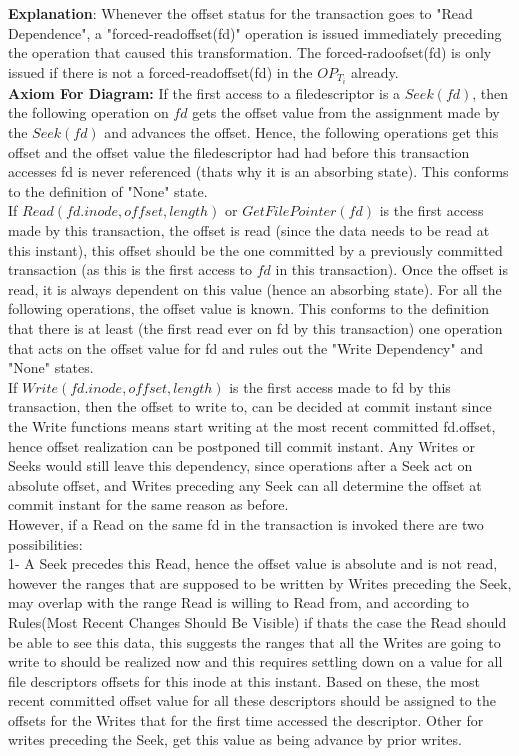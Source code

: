 \documentclass[a4paper, 11pt]{article}
\begin{document}
\textbf{Explanation}: Whenever the offset status for the transaction goes to "Read Dependence", a "forced-readoffset(fd)" operation is issued immediately preceding the operation that caused this transformation. The forced-radoofset(fd) is only issued if there is not a forced-readoffset(fd) in the $OP_{T_i}$ already.\\ 

\textbf{Axiom For Diagram:} If the first access to a filedescriptor is a $Seek(fd)$, then the following operation on $fd$ gets the offset value from the assignment made by the $Seek(fd)$ and advances the offset. Hence, the following operations get this offset and the offset value the filedescriptor had had before this transaction accesses fd is never referenced (thats why it is an absorbing state). This conforms to the definition of "None" state.\\ 

If $Read(fd.inode, offset, length)$ or $GetFilePointer(fd)$ is the first access made by this transaction, the offset is read (since the data needs to be read at this instant), this offset should be the one committed by a previously committed transaction (as this is the first access to $fd$ in this transaction). Once the offset is read, it is always dependent on this value (hence an absorbing state). For all the following operations, the offset value is known. This conforms to the definition that there is at least (the first read ever on fd by this transaction) one operation that acts on the offset value for fd and rules out the "Write Dependency" and "None" states.\\

If $Write(fd.inode, offset, length)$ is the first access made to fd by this transaction, then the offset to write to, can be decided at commit instant since the Write functions means start writing at the most recent committed fd.offset, hence offset realization can be postponed till commit instant. Any Writes or Seeks would still leave this dependency, since operations after a Seek act on absolute offset, and Writes preceding any Seek can all determine the offset at commit instant for the same reason as before.\\    

However, if a Read on the same fd in the transaction is invoked there are two possibilities:\\

1- A Seek precedes this Read, hence the offset value is absolute and is not read, however the ranges that are supposed to be written by Writes preceding the Seek, may overlap with the range Read is willing to Read from, and according to Rules(Most Recent Changes Should Be Visible) if thats the case the Read should be able to see this data, this suggests the ranges that all the Writes are going to write to should be realized now and this requires settling down on a value for all file descriptors offsets for this inode at this instant. Based on these, the most recent committed offset value for all these descriptors should be assigned to the offsets for the Writes that for the first time accessed the descriptor. Other for writes preceding the Seek, get this value as being advance by prior writes.\\
\end{document}
